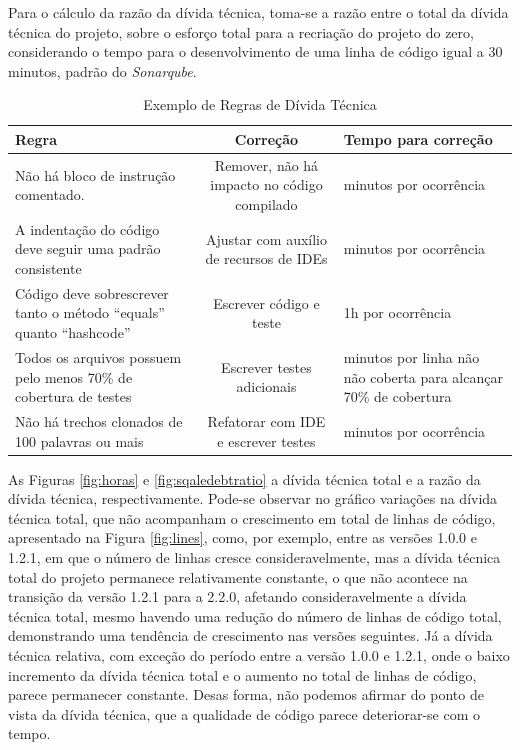 Para o cálculo da razão da dívida técnica, toma-se a razão entre o total da dívida técnica do projeto, sobre o esforço total para a recriação do projeto do zero, considerando o tempo para o desenvolvimento de uma linha de código igual a 30 minutos, padrão do \textit{Sonarqube}.
\begin{table}[h]
	\begin{centering}
		\begin{tabular}{|>{\centering}p{0.15\textheight}|c|>{\centering}p{0.1\textheight}|}
			\hline 
			Regra & Correção & Tempo para correção\tabularnewline
			\hline 
			\hline 
			Não há bloco de instrução comentado. & Remover, não há impacto no código compilado & 2 minutos por ocorrência\tabularnewline
			\hline 
			A indentação do código deve seguir uma padrão consistente & Ajustar com auxílio de recursos de IDEs & 2 minutos por ocorrência\tabularnewline
			\hline 
			Código deve sobrescrever tanto o método ``equals'' quanto ``hashcode'' & Escrever código e teste & 1h por ocorrência\tabularnewline
			\hline 
			Todos os arquivos possuem pelo menos 70\% de cobertura de testes & Escrever testes adicionais & 20 minutos por linha não não coberta para alcançar 70\% de cobertura\tabularnewline
			\hline 
			Não há trechos clonados de 100 palavras ou mais & Refatorar com IDE e escrever testes & 20 minutos por ocorrência\tabularnewline
			\hline 
		\end{tabular}
		\par\end{centering}
	\caption{Exemplo de Regras de Dívida Técnica}
	\label{table:Tabela de remediacao}
\end{table}


As Figuras \ref{fig:horas} e \ref{fig:sqaledebtratio} a dívida técnica total e a razão da dívida técnica, respectivamente. Pode-se observar no gráfico variações na dívida técnica total, que não acompanham o crescimento em total de linhas de código, apresentado na Figura \ref{fig:lines}, como, por exemplo, entre as versões 1.0.0 e 1.2.1, em que o número de linhas cresce consideravelmente, mas a dívida técnica total do projeto permanece relativamente constante, o que não acontece na transição da versão 1.2.1 para a 2.2.0, afetando consideravelmente a dívida técnica total, mesmo havendo uma redução do número de linhas de código total, demonstrando uma tendência de crescimento nas versões seguintes. 
Já a dívida técnica relativa, com exceção do período entre a versão 1.0.0 e 1.2.1, onde o baixo incremento da dívida técnica total e o aumento no total de linhas de código, parece permanecer constante. 
Desas forma, não podemos afirmar do ponto de vista da dívida técnica, que a qualidade de código parece deteriorar-se com o tempo.

